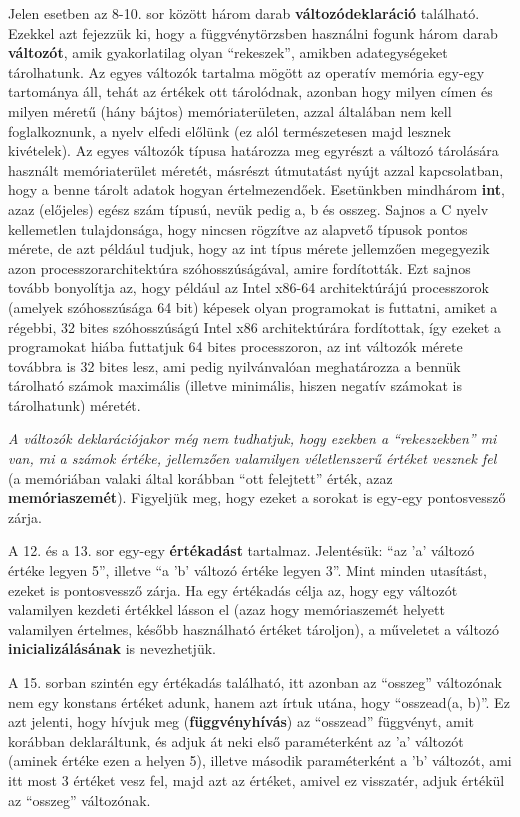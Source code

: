 Jelen esetben az 8-10. sor között három darab \textbf{változódeklaráció} található. Ezekkel azt fejezzük ki, hogy a függvénytörzsben használni fogunk három darab \textbf{változót}, amik gyakorlatilag olyan ``rekeszek'', amikben adategységeket tárolhatunk. Az egyes változók tartalma mögött az operatív memória egy-egy tartománya áll, tehát az értékek ott tárolódnak, azonban hogy milyen címen és milyen méretű (hány bájtos) memóriaterületen, azzal általában nem kell foglalkoznunk, a nyelv elfedi előlünk (ez alól természetesen majd lesznek kivételek). Az egyes változók típusa határozza meg egyrészt a változó tárolására használt memóriaterület méretét, másrészt útmutatást nyújt azzal kapcsolatban, hogy a benne tárolt adatok hogyan értelmezendőek. Esetünkben mindhárom \textbf{int}, azaz (előjeles) egész szám típusú, nevük pedig a, b és osszeg. Sajnos a C nyelv kellemetlen tulajdonsága, hogy nincsen rögzítve az alapvető típusok pontos mérete, de azt például tudjuk, hogy az int típus mérete jellemzően megegyezik azon processzorarchitektúra szóhosszúságával, amire fordították. Ezt sajnos tovább bonyolítja az, hogy például az Intel x86-64 architektúrájú processzorok (amelyek szóhosszúsága 64 bit) képesek olyan programokat is futtatni, amiket a régebbi, 32 bites szóhosszúságú Intel x86 architektúrára fordítottak, így ezeket a programokat hiába futtatjuk 64 bites processzoron, az int változók mérete továbbra is 32 bites lesz, ami pedig nyilvánvalóan meghatározza a bennük tárolható számok maximális (illetve minimális, hiszen negatív számokat is tárolhatunk) méretét.

\emph{A változók deklarációjakor még nem tudhatjuk, hogy ezekben a ``rekeszekben'' mi van, mi a számok értéke, jellemzően valamilyen véletlenszerű értéket vesznek fel} (a memóriában valaki által korábban ``ott felejtett'' érték, azaz \textbf{memóriaszemét}). Figyeljük meg, hogy ezeket a sorokat is egy-egy pontosvessző zárja.

A 12. és a 13. sor egy-egy \textbf{értékadást} tartalmaz. Jelentésük: ``az 'a' változó értéke legyen 5'', illetve ``a 'b' változó értéke legyen 3''. Mint minden utasítást, ezeket is pontosvessző zárja. Ha egy értékadás célja az, hogy egy változót valamilyen kezdeti értékkel lásson el (azaz hogy memóriaszemét helyett valamilyen értelmes, később használható értéket tároljon), a műveletet a változó \textbf{inicializálásának} is nevezhetjük.

A 15. sorban szintén egy értékadás található, itt azonban az ``osszeg'' változónak nem egy konstans értéket adunk, hanem azt írtuk utána, hogy ``osszead(a, b)''. Ez azt jelenti, hogy hívjuk meg (\textbf{függvényhívás}) az ``osszead'' függvényt, amit korábban deklaráltunk, és adjuk át neki első paraméterként az 'a' változót (aminek értéke ezen a helyen 5), illetve második paraméterként a 'b' változót, ami itt most 3 értéket vesz fel, majd azt az értéket, amivel ez visszatér, adjuk értékül az ``osszeg'' változónak.

